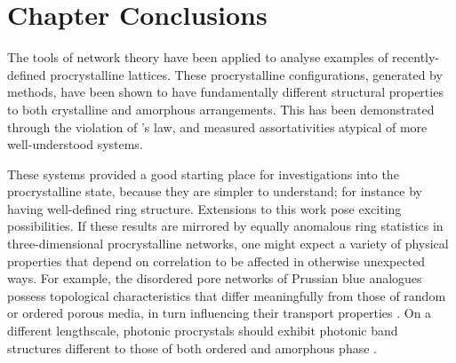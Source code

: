 \section{Chapter Conclusions}

The tools of network theory have been applied to analyse \td{} examples of recently\--defined procrystalline lattices.
These procrystalline configurations, generated by \mc{} methods, have been shown to have fundamentally different structural properties to both crystalline and amorphous arrangements.
This has been demonstrated through the violation of \lm's law, and measured assortativities atypical of more well\--understood systems.

These \td{} systems provided a good starting place for investigations into the procrystalline state, because they are simpler to understand; for instance by having well\--defined ring structure.
Extensions to this work pose exciting possibilities.
If these results are mirrored by equally anomalous ring statistics in three\--dimensional procrystalline networks, one might expect a variety of physical properties that depend on correlation to be affected in otherwise unexpected ways. 
For example, the disordered pore networks of Prussian blue analogues possess topological characteristics that differ meaningfully from those of random or ordered porous media, in turn influencing their transport properties \cite{Simonov2020}.
On a different lengthscale, photonic procrystals should exhibit photonic band structures different to those of both ordered and amorphous phase \cite{Florescu2009,Sellers2017}.
